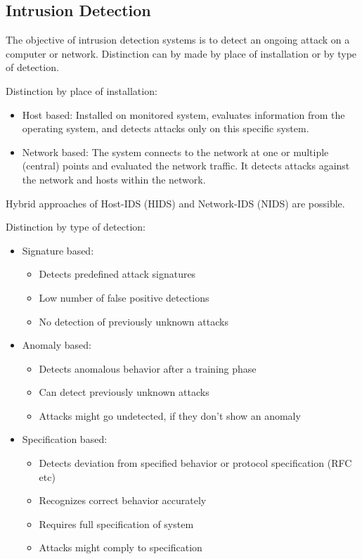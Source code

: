 \subsection{Intrusion Detection}
The objective of intrusion detection systems is to detect an ongoing attack on a
computer or network. Distinction can by made by place of installation or by type
of detection.

Distinction by place of installation:
\begin{itemize}
    \item Host based: Installed on monitored system, evaluates information from
          the operating system, and detects attacks only on this specific
          system.
    \item Network based: The system connects to the network at one or multiple
          (central) points and evaluated the network traffic. It detects attacks
          against the network and hosts within the network.
\end{itemize}
Hybrid approaches of Host-IDS (HIDS) and Network-IDS (NIDS) are possible.

Distinction by type of detection:
\begin{itemize}
    \item Signature based:
          \begin{itemize}
              \item Detects predefined attack signatures
              \item Low number of false positive detections
              \item No detection of previously unknown attacks
          \end{itemize}
    \item Anomaly based:
          \begin{itemize}
              \item Detects anomalous behavior after a training phase
              \item Can detect previously unknown attacks
              \item Attacks might go undetected, if they don't show an anomaly
          \end{itemize}
    \item Specification based:
          \begin{itemize}
              \item Detects deviation from specified behavior or protocol
                    specification (RFC etc)
              \item Recognizes correct behavior accurately
              \item Requires full specification of system
              \item Attacks might comply to specification
          \end{itemize}
\end{itemize}

